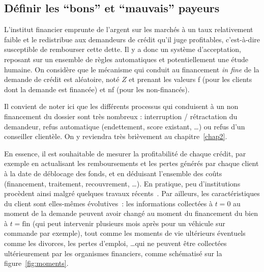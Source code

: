 \subsection{Définir les ``bons'' et ``mauvais'' payeurs} \label{subsec:critere}

L'institut financier emprunte de l'argent sur les marchés à un taux relativement faible et le redistribue aux demandeurs de crédit qu'il juge profitables, c'est-à-dire susceptible de rembourser cette dette. Il y a donc un système d'acceptation, reposant sur un ensemble de règles automatiques et potentiellement une étude humaine. On considère que le mécanisme qui conduit au financement \textit{in fine} de la demande de crédit est aléatoire, noté $Z$ et prenant les valeurs f (pour les clients dont la demande est financée) et nf (pour les non-financés).

Il convient de noter ici que les différents processus qui conduisent à un non financement du dossier sont très nombreux : interruption / rétractation du demandeur, refus automatique (endettement, \gls{score} existant, \dots) ou refus d'un conseiller clientèle. On y reviendra très brièvement au chapitre~\ref{chap2}.

En essence, il est souhaitable de mesurer la profitabilité de chaque crédit, par exemple en actualisant les remboursements et les pertes générés par chaque client à la date de déblocage des fonds, et en déduisant l'ensemble des coûts (financement, traitement, recouvrement, \dots). En pratique, peu d'institutions procèdent ainsi malgré quelques travaux récents~\cite{finlay2010credit}. Par ailleurs, les caractéristiques du client sont elles-mêmes évolutives~: les informations collectées à $t=0$ au moment de la demande peuvent avoir changé au moment du financement du bien à $t = \text{fin}$ (qui peut intervenir plusieurs mois après pour un véhicule sur commande par exemple), tout comme les moments de vie ultérieurs éventuels comme les divorces, les pertes d'emploi, \dots qui ne peuvent être collectées ultérieurement par les organismes financiers, comme schématisé sur la figure~\ref{fig:moments}.

